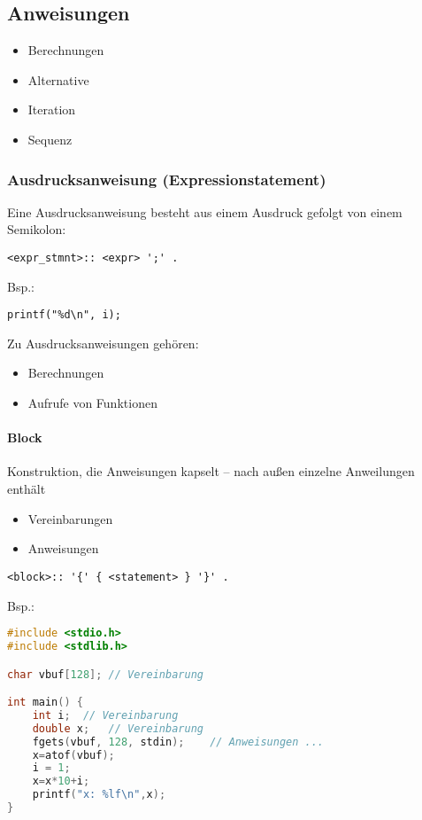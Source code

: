 \subsection{Anweisungen}
\begin{itemize}
\item Berechnungen
\item Alternative
\item Iteration
\item Sequenz
\end{itemize}
\subsubsection[Ausdrucksanweisung]{Ausdrucksanweisung (Expressionstatement)}
Eine Ausdrucksanweisung besteht aus einem Ausdruck gefolgt von einem Semikolon:
\begin{lstlisting}
<expr_stmnt>:: <expr> ';' .
\end{lstlisting}

Bsp.:
\begin{lstlisting}
printf("%d\n", i);
\end{lstlisting}
Zu Ausdrucksanweisungen gehören:
\begin{itemize}
\item Berechnungen
\item Aufrufe von Funktionen
\end{itemize}
\paragraph{Block}
Konstruktion, die Anweisungen kapselt -- nach außen einzelne Anweilungen enthält
\begin{itemize}
\item Vereinbarungen
\item Anweisungen
\end{itemize}
\begin{lstlisting}
<block>:: '{' { <statement> } '}' .
\end{lstlisting}

Bsp.:
\begin{lstlisting}[language=C]
#include <stdio.h>
#include <stdlib.h>

char vbuf[128];	// Vereinbarung

int main() {
	int i;	// Vereinbarung
	double x;	// Vereinbarung
	fgets(vbuf, 128, stdin);	// Anweisungen ...
	x=atof(vbuf);
	i = 1;
	x=x*10+i;
	printf("x: %lf\n",x);
}
\end{lstlisting}


